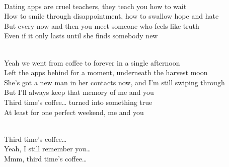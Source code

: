 \begin{lyrics}
\\
Dating apps are cruel teachers, they teach you how to wait\\
How to smile through disappointment, how to swallow hope and hate\\
But every now and then you meet someone who feels like truth\\
Even if it only lasts until she finds somebody new

\\
Yeah we went from coffee to forever in a single afternoon\\
Left the apps behind for a moment, underneath the harvest moon\\
She’s got a new man in her contacts now, and I’m still swiping through\\
But I’ll always keep that memory of me and you\\
Third time’s coffee… turned into something true\\
At least for one perfect weekend, me and you

\\
Third time’s coffee…\\
Yeah, I still remember you…\\
Mmm, third time’s coffee…

\end{lyrics}

